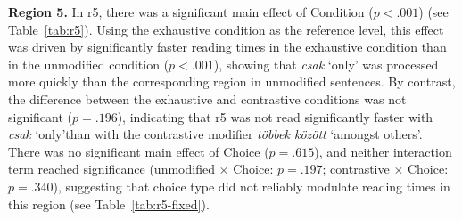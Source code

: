 \documentclass[ruler]{CUP-JNL-LIN}%
\begin{document}
\noindent \textbf{Region 5.} In r5, there was a significant main effect of Condition ($p<.001$) (see Table~\ref{tab:r5}). Using the exhaustive condition as the reference level, this effect was driven by significantly faster reading times in the exhaustive condition than in the unmodified condition ($p<.001$), showing that \textit{csak} `only' was processed more quickly than the corresponding region in unmodified sentences. By contrast, the difference between the exhaustive and contrastive conditions was not significant ($p=.196$), indicating that r5 was not read significantly faster with \textit{csak} `only'than with the contrastive modifier \textit{többek között} `amongst others'. There was no significant main effect of Choice ($p=.615$), and neither interaction term reached significance (unmodified $\times$ Choice: $p=.197$; contrastive $\times$ Choice: $p=.340$), suggesting that choice type did not reliably modulate reading times in this region (see Table~\ref{tab:r5-fixed}).

\end{document}
